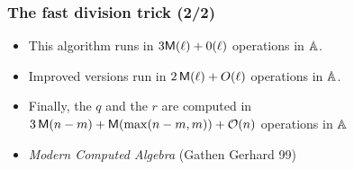 \begin{frame}
\frametitle{The fast division trick (2/2)}


\medskip

\begin{itemize}
\item  This algorithm runs in $3 {\mathsf{M}}(\ell) + 0(\ell)$ 
operations in ${\mathbb{A}}$. 
\item Improved versions run in $2\,{\mathsf{M}}(\ell) + O({\ell})$ 
operations in ${\mathbb{A}}$. 
\item Finally, the  $q$ 
and the  $r$ are computed 
in $3 \, {\mathsf{M}}(n - m) + {\mathsf{M}}({\max}(n-m,m)) + {\cal O}(n)$
operations in ${\mathbb{A}}$
\item {\em Modern Computed Algebra} (Gathen Gerhard 99)
\end{itemize}

\end{frame}
